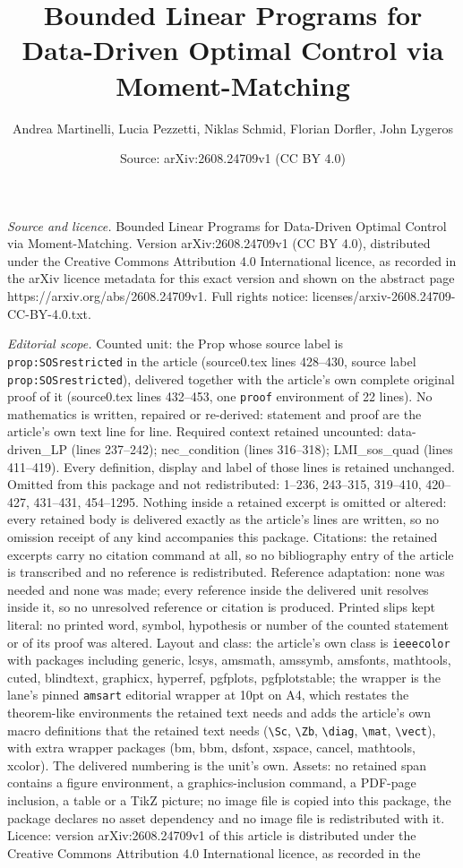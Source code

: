 \documentclass[10pt,a4paper]{amsart}
\title[Bounded Linear Programs for Data-Driven Optimal Control via ]{Bounded Linear Programs for Data-Driven Optimal Control via Moment-Matching}
\author{Andrea Martinelli, Lucia Pezzetti, Niklas Schmid, Florian Dorfler, John Lygeros}
\date{Source: arXiv:2608.24709v1 (CC BY 4.0)}
\begin{document}
\maketitle

\noindent\emph{Source and licence.} Bounded Linear Programs for Data-Driven Optimal Control via Moment-Matching. Version arXiv:2608.24709v1 (CC BY 4.0), distributed under the Creative Commons Attribution 4.0 International licence, as recorded in the arXiv licence metadata for this exact version and shown on the abstract page https://arxiv.org/abs/2608.24709v1. Full rights notice: licenses/arxiv-2608.24709-CC-BY-4.0.txt.\par\smallskip

\noindent\textit{Editorial scope.} Counted unit: the Prop whose source label is \texttt{prop:SOSrestricted} in the article (source0.tex lines 428--430, source label \texttt{prop:SOSrestricted}), delivered together with the article's own complete original proof of it (source0.tex lines 432--453, one \texttt{proof} environment of 22 lines). No mathematics is written, repaired or re-derived: statement and proof are the article's own text line for line. Required context retained uncounted: data-driven\_LP (lines 237--242); nec\_condition (lines 316--318); LMI\_sos\_quad (lines 411--419). Every definition, display and label of those lines is retained unchanged. Omitted from this package and not redistributed: 1--236, 243--315, 319--410, 420--427, 431--431, 454--1295. Nothing inside a retained excerpt is omitted or altered: every retained body is delivered exactly as the article's lines are written, so no omission receipt of any kind accompanies this package. Citations: the retained excerpts carry no citation command at all, so no bibliography entry of the article is transcribed and no reference is redistributed. Reference adaptation: none was needed and none was made; every reference inside the delivered unit resolves inside it, so no unresolved reference or citation is produced. Printed slips kept literal: no printed word, symbol, hypothesis or number of the counted statement or of its proof was altered. Layout and class: the article's own class is \texttt{ieeecolor} with packages including generic, lcsys, amsmath, amssymb, amsfonts, mathtools, cuted, blindtext, graphicx, hyperref, pgfplots, pgfplotstable; the wrapper is the lane's pinned \texttt{amsart} editorial wrapper at 10pt on A4, which restates the theorem-like environments the retained text needs and adds the article's own macro definitions that the retained text needs (\texttt{\textbackslash Sc}, \texttt{\textbackslash Zb}, \texttt{\textbackslash diag}, \texttt{\textbackslash mat}, \texttt{\textbackslash vect}), with extra wrapper packages (bm, bbm, dsfont, xspace, cancel, mathtools, xcolor). The delivered numbering is the unit's own. Assets: no retained span contains a figure environment, a graphics-inclusion command, a PDF-page inclusion, a table or a TikZ picture; no image file is copied into this package, the package declares no asset dependency and no image file is redistributed with it. Licence: version arXiv:2608.24709v1 of this article is distributed under the Creative Commons Attribution 4.0 International licence, as recorded in the 
\end{document}
